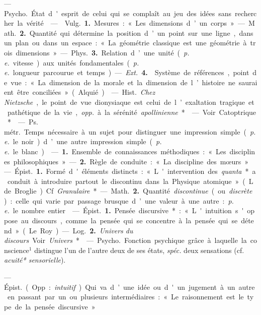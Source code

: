 \begin{itemize}[leftmargin=1cm, label=, itemsep=1pt]
 — \si{Psycho.} État d'esprit de celui qui se complaît au jeu
des idées sans rechercher la vérité.

 —  \si{Vulg.} {\bf 1.} Mesures :
« Les dimensions d’un corps ». —
\si{Math.} {\bf 2.} Quantité qui détermine
la position d’un point sur une ligne,
dans un plan ou dans un espace :
« La géométrie classique est une
géométrie à trois dimensions ». —
\si{Phys.} {\bf 3.} Relation d’une unité ({\it p. e.}
vitesse) aux unités fondamentales
({\it p. e.} longueur parcourue et temps).

— {\it Ext.} {\bf 4.}  Système de références, point de vue : « La dimension de la morale et la dimension
de l’histoire ne sauraient être conciliées » (Alquié).

 — \si{Hist.} {\it Chez Nietzsche},
le point de vue dionysiaque est celui
de l’exaltation tragique et pathétique de la vie, {\it opp.} à la sérénité
{\it apollinienne}*.

 — Voir Catoptrique*.

 — \si{Ps. métr.} Temps nécessaire à un sujet
pour distinguer une impression
simple ({\it p. e.} le noir) d’une autre impression simple ({\it p. e.} le blanc).

 — {\bf 1.} Ensemble de connaissances méthodiques : « Les
disciplines philosophiques » — {\bf 2.}
Règle de conduite : « La discipline
des mœurs. »

 — \si{Épist.} {\bf 1.} Formé d'éléments distincts : « L'intervention
des {\it quanta}* a conduit à introduire
partout le discontinu dans la Physique atomique » (L. de Broglie).
Cf. {\it Granulaire}*.

— \si{Math.} {\bf 2.} Quantité {\it discontinue}
(ou {\it discrète}) : celle qui varie par passage brusque d’une valeur à une
autre : {\it p. e.} le nombre entier.

 — \si{Épist.} {\bf 1.} Pensée discursive* : « L'intuition s'oppose au discours, comme la pensée qui se concentre à la pensée qui se détend »
(Le Roy).

— \si{Log.} {\bf 2.} {\it Univers du discours}. Voir {\it Univers}*.

 — \si{Psycho.} Fonction
psychique grâce à laquelle la conscience$^1$ distingue l’un de l'autre
deux de ses états, {\it spéc.} deux sensations
(cf. {\it acuité* sensorielle}).

 — \si{Épist.} (Opp. : {\it intuitif}).
Qui va d’une idée ou d'un jugement
à un autre en passant par un ou plusieurs intermédiaires :
« Le raisonnement est le type de la pensée discursive. »


\end{itemize}
